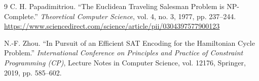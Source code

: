 \documentclass[letterpaper,11pt]{article}
\begin{document}
{\begin{thebibliography}{9}
    C. H. Papadimitriou. ``The Euclidean Traveling Salesman Problem is NP-Complete.''
    \textit{Theoretical Computer Science}, vol. 4, no. 3, 1977, pp. 237--244.
    \url{https://www.sciencedirect.com/science/article/pii/0304397577900123}

   N.-F. Zhou. ``In Pursuit of an
    Efficient SAT Encoding for the Hamiltonian Cycle Problem.''
    \textit{International Conference on Principles and Practice of
      Constraint Programming (CP)}, Lecture Notes in Computer Science,
    vol. 12176, Springer, 2019, pp. 585--602.

  \end{thebibliography}

} %
\end{document}
